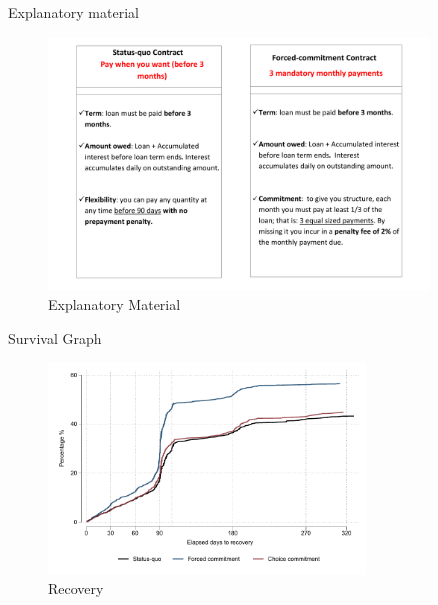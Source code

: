 \documentclass[8pt]{beamer}
\begin{document}
\begin{frame}{Explanatory material}
    \begin{figure}[H]
     \caption{Explanatory Material}
    \label{ExplanatoryMaterial}
    \begin{center}
        \includegraphics[width=0.9\textwidth]{Figuras/micas.pdf}
    \end{center}
\end{figure}
\end{frame}

\begin{frame}{Survival Graph}
 
\begin{figure}[H]
        \caption{Recovery}
    \label{survival_graph}
    \begin{center}
        \centering
        \includegraphics[width=0.75\textwidth]{Figuras/survival_graph_unpledge.pdf}
    \end{center}
\end{figure}   
\end{frame}
\end{document}
